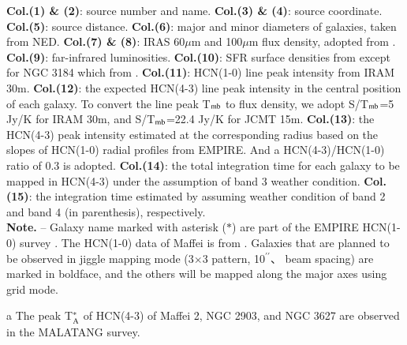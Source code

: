\documentclass[legal,11pt]{article}
\def\arcsec {\hbox{$^{\prime\prime}$}}
\def\,{\thinspace}
\begin{document}
\begin{table}
\begin{threeparttable}[b]
\begin{tabular}{clccccccccccccr}
\hline
\end{tabular}

\begin{tablenotes}
% 
{\bf Col.(1) \& (2)}: source number and name. {\bf Col.(3) \& (4)}: source coordinate. 
% 
{\bf Col.(5)}: source distance. 
% 
{\bf Col.(6)}: major and minor diameters of galaxies, taken from NED. 
% 
{\bf Col.(7) \& (8)}:  IRAS 60$\mu$m and 100$\mu$m flux density, adopted from \citet{smk03}. 
% 
{\bf Col.(9)}: far-infrared luminosities. 
% 
{\bf Col.(10)}: SFR surface densities from \cite{lgg2015} except for NGC 3184 which from \cite{Leroy2013}. 
% 
{\bf Col.(11)}: HCN(1-0)
line peak intensity from IRAM 30m. 
% 
{\bf Col.(12)}: the expected HCN(4-3) line peak intensity in the central position of each galaxy. To convert the line peak T$_{\rm mb}$ to flux density, we adopt S/T$_{\rm mb}$=5 Jy/K for IRAM 30m, and S/T$_{\rm mb}$=22.4 Jy/K for JCMT 15m. 
% 
{\bf Col.(13)}: the HCN(4-3) peak intensity estimated at the corresponding radius based on the slopes of HCN(1-0) radial profiles from EMPIRE. And a HCN(4-3)/HCN(1-0) ratio of 0.3 is adopted.
% 
{\bf Col.(14)}: the total integration time for each galaxy to be mapped in HCN(4-3) under the assumption of band 3 weather condition.
% 
{\bf Col.(15)}: the integration time estimated 
by assuming weather condition of band 2 and band 4 (in parenthesis), respectively. \\

{\bf Note.} -- Galaxy name marked with asterisk ($\ast$) are part of the EMPIRE HCN(1-0) survey \citep{Jimenez-Donaire:2019}. The HCN(1-0) data of Maffei\,2 is from \citet{Nguyen1992}. Galaxies that are planned to be observed in jiggle mapping mode (3$\times$3 pattern, 10\arcsec、 beam spacing) are marked in boldface, and the others will be mapped along the major axes using grid mode.

\item[a]{The peak T$_{\rm A}^*$ of HCN(4-3) of Maffei 2, NGC 2903, and NGC 3627 are observed in the MALATANG survey.}

\end{tablenotes}
\end{threeparttable}

\end{table}
\end{document}
